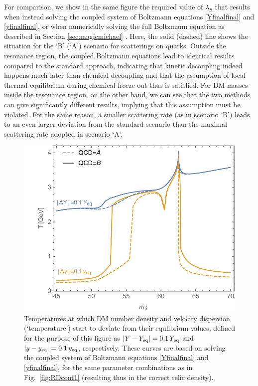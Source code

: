 \documentclass[twocolumn,showpacs,amsmath,amssymb,superscriptaddress,nofootinbib]{revtex4-1}
\begin{document}
For comparison, we show in the same figure the required value of $\lambda_S$ that results when instead
solving the coupled system of Boltzmann equations \eqref{Yfinalfinal} and \eqref{yfinalfinal},
or when numerically solving the full Boltzmann equation as described in Section \ref{sec:magicmichael} .
Here, the solid (dashed) line shows the situation for the `B' (`A') scenario for scatterings on quarks.
Outside the resonance region, the coupled Boltzmann equations lead to identical results compared to 
the standard approach, indicating
that kinetic decoupling indeed happens much later than chemical  decoupling and that the assumption 
of local thermal equilibrium during chemical freeze-out thus is satisfied.
For DM masses inside the resonance region,  on the other hand, we can see that the two methods can 
give significantly different results, implying that this assumption must be violated. For the same reason,
a smaller scattering rate (as in scenario `B') leads to an even larger deviation from the 
standard scenario than the maximal scattering rate adopted in scenario `A'.

\begin{figure}[t!]
\vspace{0.11cm}
  \includegraphics[width=0.91\columnwidth]{Tkdplot_one}
  \caption{Temperatures at which DM number density and velocity dispersion (`temperature') start to deviate from their
  equlibrium values, defined for the purpose of this figure as $|Y-Y_{\rm eq}|=0.1\,Y_{\rm eq}$ and $|y-y_{\rm eq}|=0.1\,y_{\rm eq}$, respectively.
  These curves are based on solving  the coupled system of Boltzmann equations  \eqref{Yfinalfinal} and 
  \eqref{yfinalfinal},  for the same parameter combinations as in Fig.~\ref{fig:RDcont1} (resulting thus in the correct 
  relic density). }
    \label{fig:TkdTcd}
\end{figure}
\end{document}
